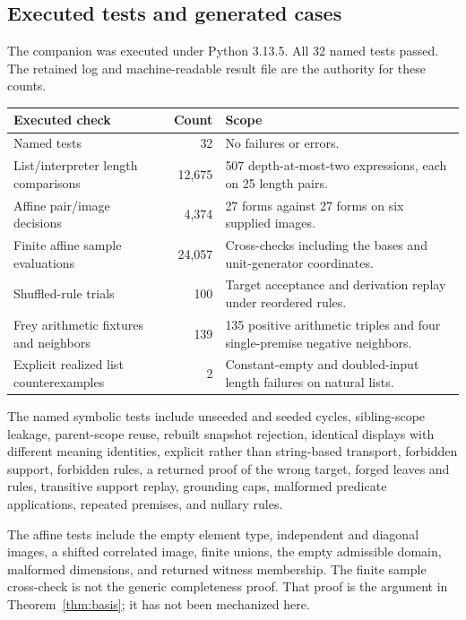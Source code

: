 \documentclass[11pt,letterpaper]{article}
\newcommand{\code}[1]{\texttt{\detokenize{#1}}}
\theoremstyle{definition}\newtheorem{definition}[theorem]{Definition}
\theoremstyle{remark}\newtheorem{remark}[theorem]{Remark}
\begin{document}
\subsection{Executed tests and generated cases}
The companion \code{test_rowan.py} was executed under Python 3.13.5.
All 32 named tests passed. The retained log and machine-readable result file
are the authority for these counts.
\begin{center}\small
\begin{tabularx}{\textwidth}{@{}P{.38\textwidth}r Y@{}}
\toprule Executed check & Count & Scope\\\midrule
Named tests & 32 & No failures or errors.\\
List/interpreter length comparisons & 12,675 & 507 depth-at-most-two expressions, each on 25 length pairs.\\
Affine pair/image decisions & 4,374 & 27 forms against 27 forms on six supplied images.\\
Finite affine sample evaluations & 24,057 & Cross-checks including the bases and unit-generator coordinates.\\
Shuffled-rule trials & 100 & Target acceptance and derivation replay under reordered rules.\\
Frey arithmetic fixtures and neighbors & 139 & 135 positive arithmetic triples and four single-premise negative neighbors.\\
Explicit realized list counterexamples & 2 & Constant-empty and doubled-input length failures on natural lists.\\
\bottomrule
\end{tabularx}
\end{center}

The named symbolic tests include unseeded and seeded cycles, sibling-scope
leakage, parent-scope reuse, rebuilt snapshot rejection, identical displays
with different meaning identities, explicit rather than string-based
transport, forbidden support, forbidden rules, a returned proof of the wrong
target, forged leaves and rules, transitive support replay, grounding caps,
malformed predicate applications, repeated premises, and nullary rules.

The affine tests include the empty element type, independent and diagonal
images, a shifted correlated image, finite unions, the empty admissible domain,
malformed dimensions, and returned witness membership. The finite sample
cross-check is not the generic completeness proof. That proof is the argument
in Theorem~\ref{thm:basis}; it has not been mechanized here.
\end{document}
